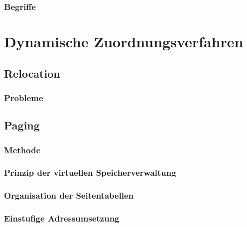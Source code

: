 \subsubsection{Begriffe}

\section{Dynamische Zuordnungsverfahren}
\subsection{Relocation}
\subsubsection{Probleme}
\subsection{Paging}
\subsubsection{Methode}
\subsubsection{Prinzip der virtuellen Speicherverwaltung}
\subsubsection{Organisation der Seitentabellen}

\subsubsection{Einstufige Adressumsetzung}

